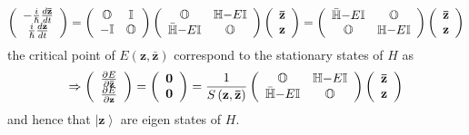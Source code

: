 \documentclass[aps,preprint]{revtex4}%
\begin{document}
\begin{equation}
\left(
\begin{array}
[c]{c}%
-\frac{i}{\hslash}\frac{d\mathbf{\bar{z}}}{dt}\\
\frac{i}{\hslash}\frac{d\mathbf{z}}{dt}%
\end{array}
\right)  =\left(
\begin{array}
[c]{cc}%
\mathbb{O} & \mathbb{I}\\
-\mathbb{I} & \mathbb{O}%
\end{array}
\right)  \left(
\begin{array}
[c]{cc}%
\mathbb{O} & \mathbb{H}\mathbf{-}E\mathbb{I}\\
\mathbb{\bar{H}}\mathbf{-}E\mathbb{I} & \mathbb{O}%
\end{array}
\right)  \left(
\begin{array}
[c]{c}%
\mathbf{\bar{z}}\\
\mathbf{z}%
\end{array}
\right)  =\left(
\begin{array}
[c]{cc}%
\mathbb{\bar{H}}\mathbf{-}E\mathbb{I} & \mathbb{O}\\
\mathbb{O} & \mathbb{H}\mathbf{-}E\mathbb{I}%
\end{array}
\right)  \left(
\begin{array}
[c]{c}%
\mathbf{\bar{z}}\\
\mathbf{z}%
\end{array}
\right)
\end{equation}
the critical point of $E\left(  \mathbf{z},\mathbf{\bar{z}}\right)  $
correspond to the stationary states of $H$ as
\begin{equation}
\Rightarrow\left(
\begin{array}
[c]{c}%
\frac{\partial E}{\partial\mathbf{\bar{z}}}\\
\frac{\partial E}{\partial\mathbf{z}}%
\end{array}
\right)  =\left(
\begin{array}
[c]{c}%
\mathbf{0}\\
\mathbf{0}%
\end{array}
\right)  =\frac{1}{S\left(  \mathbf{z},\mathbf{\bar{z}}\right)  }\left(
\begin{array}
[c]{cc}%
\mathbb{O} & \mathbb{H}\mathbf{-}E\mathbb{I}\\
\mathbb{\bar{H}}\mathbf{-}E\mathbb{I} & \mathbb{O}%
\end{array}
\right)  \left(
\begin{array}
[c]{c}%
\mathbf{\bar{z}}\\
\mathbf{z}%
\end{array}
\right)
\end{equation}
and hence that $\left\vert \mathbf{z}\right\rangle $ are eigen states of $H$.
\end{document}
